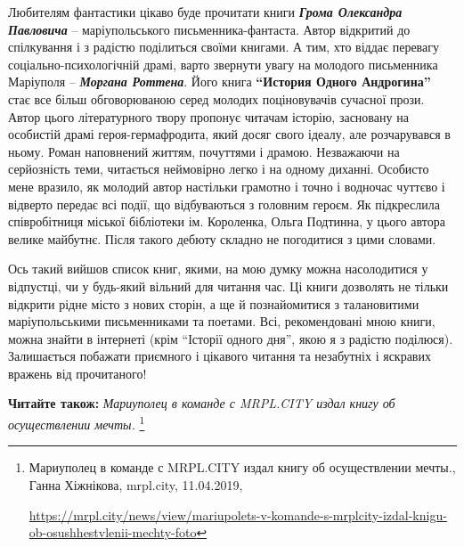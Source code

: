 Любителям фантастики цікаво буде прочитати книги \emph{\textbf{Грома Олександра Павловича}} –
маріупольського письменника-фантаста. Автор відкритий до спілкування і з
радістю поділиться своїми книгами. А тим, хто віддає перевагу
соціально-психологічній драмі, варто звернути увагу на молодого письменника
Маріуполя – \emph{\textbf{Моргана Роттена}}. Його книга \textbf{\enquote{История Одного Андрогина}} стає все
більш обговорюваною серед молодих поціновувачів сучасної прози. Автор цього
літературного твору пропонує читачам історію, засновану на особистій драмі
героя-гермафродита, який досяг свого ідеалу, але розчарувався в ньому. Роман
наповнений життям, почуттями і драмою. Незважаючи на серйозність теми,
читається неймовірно легко і на одному диханні. Особисто мене вразило, як
молодий автор настільки грамотно і точно і водночас чуттєво і відверто передає
всі події, що відбуваються з головним героєм. Як підкреслила співробітниця
міської бібліотеки ім. Короленка, Ольга Подтинна, у цього автора велике
майбутнє. Після такого дебюту складно не погодитися з цими словами.

Ось такий вийшов список книг, якими, на мою думку можна насолодитися у
відпустці, чи у будь-який вільний для читання час. Ці книги дозволять не тільки
відкрити рідне місто з нових сторін, а ще й познайомитися з талановитими
маріупольськими письменниками та поетами. Всі, рекомендовані мною книги, можна
знайти в інтернеті (крім \enquote{Історії одного дня}, якою я з радістю поділюся).
Залишається побажати приємного і цікавого читання та незабутніх і яскравих
вражень від прочитаного!

\textbf{Читайте також:} \emph{Мариуполец в команде с MRPL.CITY издал книгу об осуществлении мечты.}%
\footnote{Мариуполец в команде с MRPL.CITY издал книгу об осуществлении мечты., Ганна Хіжнікова, mrpl.city, 11.04.2019, \par%
\url{https://mrpl.city/news/view/mariupolets-v-komande-s-mrplcity-izdal-knigu-ob-osushhestvlenii-mechty-foto}}

